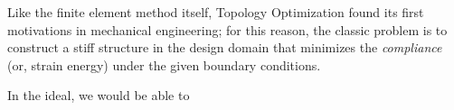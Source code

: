 Like the finite element method itself, Topology Optimization found its first motivations in mechanical engineering;
for this reason, the classic problem is to construct a stiff structure in the design domain that minimizes the
\textit{compliance} (or, strain energy) under the given boundary conditions.

In the ideal, we would be able to 

